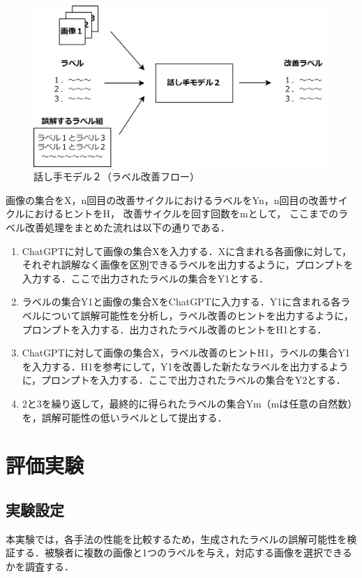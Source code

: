 \documentclass[a4paper,11pt]{jreport}
\begin{document}
\begin{figure}[H]
	\centering
	\includegraphics[width=0.8\linewidth]{figures/PCGspeaker2.png}
	\caption{話し手モデル２（ラベル改善フロー）}
	\label{fig:PCGspeaker2}
\end{figure}

画像の集合をX，n回目の改善サイクルにおけるラベルをYn，n回目の改善サイクルにおけるヒントをH，
改善サイクルを回す回数をmとして，
ここまでのラベル改善処理をまとめた流れは以下の通りである．

\begin{enumerate}
  \item ChatGPTに対して画像の集合Xを入力する．Xに含まれる各画像に対して，それぞれ誤解なく画像を区別できるラベルを出力するように，プロンプトを入力する．ここで出力されたラベルの集合をY1とする．
  \item ラベルの集合Y1と画像の集合XをChatGPTに入力する．Y1に含まれる各ラベルについて誤解可能性を分析し，ラベル改善のヒントを出力するように，プロンプトを入力する．出力されたラベル改善のヒントをH1とする．
  \item ChatGPTに対して画像の集合X，ラベル改善のヒントH1，ラベルの集合Y1を入力する．H1を参考にして，Y1を改善した新たなラベルを出力するように，プロンプトを入力する．ここで出力されたラベルの集合をY2とする．
  \item 2と3を繰り返して，最終的に得られたラベルの集合Ym（mは任意の自然数）を，誤解可能性の低いラベルとして提出する．
\end{enumerate}


\chapter{評価実験}

\section{実験設定}

本実験では，各手法の性能を比較するため，生成されたラベルの誤解可能性を検証する．被験者に複数の画像と1つのラベルを与え，対応する画像を選択できるかを調査する．
\end{document}
